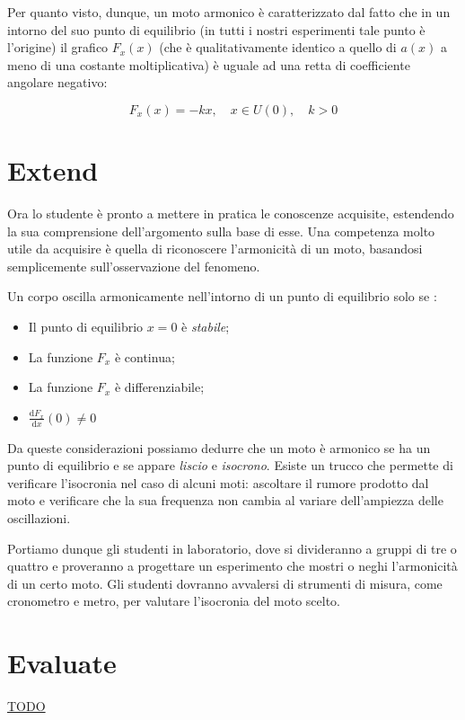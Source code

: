 \documentclass{article}
\begin{document}
Per quanto visto, dunque, un moto armonico è caratterizzato dal fatto che in un intorno del suo punto di
equilibrio (in tutti i nostri esperimenti tale punto è l'origine) il grafico $F_x(x)$ (che è qualitativamente identico a
quello di $a(x)$ a meno di una costante moltiplicativa) è uguale ad una retta di coefficiente angolare negativo:

\begin{equation}
F_{x}(x)=-kx, \quad x \in U(0),\quad k>0
\end{equation}

\section{Extend}
Ora lo studente è pronto a mettere in pratica le conoscenze
acquisite, estendendo la sua comprensione dell'argomento
sulla base di esse. Una competenza molto utile da acquisire
è quella di riconoscere l'armonicità di un moto, basandosi
semplicemente sull'osservazione del fenomeno.

Un corpo oscilla armonicamente nell'intorno di un punto
di equilibrio solo se \cite{giliberti2014detecting}:

\begin{itemize}
\item Il punto di equilibrio $x=0$ è \emph{stabile};
\item La funzione $F_{x}$ è continua;
\item La funzione $F_{x}$ è differenziabile;
\item $\frac{\mathrm{d}F_{x}}{\mathrm{d}x}(0) \neq 0$
\end{itemize}

Da queste considerazioni possiamo dedurre che un moto
è armonico se ha un punto di equilibrio e se appare
\emph{liscio} e \emph{isocrono}.
Esiste un trucco che permette di verificare l'isocronia
nel caso di alcuni moti: ascoltare il rumore prodotto
dal moto e verificare che la sua frequenza non cambia al
variare dell'ampiezza delle oscillazioni.

Portiamo dunque gli studenti in laboratorio, dove si divideranno
a gruppi di tre o quattro e proveranno a progettare un esperimento
che mostri o neghi l'armonicità di un certo moto.
Gli studenti dovranno avvalersi di strumenti di misura,
come cronometro e metro, per valutare l'isocronia del
moto scelto.

\section{Evaluate}
\underline{TODO}

{}

\end{document}
